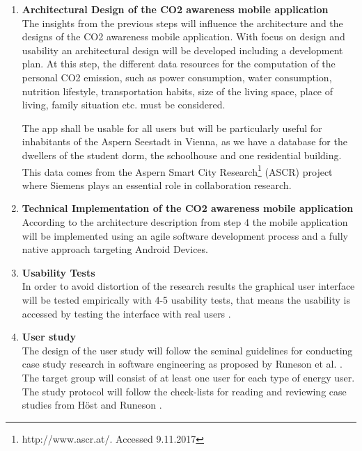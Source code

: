 \documentclass[12pt,a4paper,titlepage,oneside]{article}
\begin{document}
\begin{enumerate}
	\item \textbf{Architectural Design of the CO2 awareness mobile application} \\
	The insights from the previous steps will influence the architecture and the designs of the CO2 awareness mobile application. With focus on design and usability an architectural design will be developed including a development plan. At this step, the different data resources for the computation of the personal CO2 emission, such as power consumption, water consumption, nutrition lifestyle, transportation habits, size of the living space, place of living, family situation etc. must be considered.
	
	The app shall be usable for all users but will be particularly useful for inhabitants of the Aspern Seestadt in Vienna, as we have a database for the dwellers of the student dorm, the schoolhouse and one residential building. This data comes from the Aspern Smart City Research\footnote{http://www.ascr.at/. Accessed 9.11.2017} (ASCR) project where Siemens plays an essential role in collaboration research. 
	
	\item \textbf{Technical Implementation of the CO2 awareness mobile application} \\
	According to the architecture description from step 4 the mobile application will be implemented using an agile software development process and a fully native approach targeting Android Devices.
	
	\item \textbf{Usability Tests} \\
	In order to avoid distortion of the research results the graphical user interface will be tested empirically with 4-5 usability tests, that means the usability is accessed by testing the interface with real users \cite{nielsen1994usability}.
	
	\item \textbf{User study} \\
	The design of the user study will follow the seminal guidelines for conducting case study research in software engineering as proposed by Runeson et al. \cite{runeson2012case}. The target group will consist of at least one user for each type of energy user. The study protocol will follow the check-lists for reading and reviewing case studies from H\"ost and Runeson \cite{host2007checklists}.
	

\end{enumerate}
\end{document}
